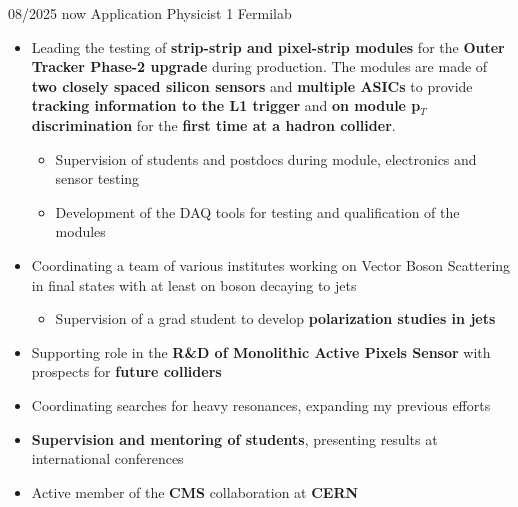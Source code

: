   \position
  {08/2025  \textemdash{} now} 
   {Application Physicist 1}
   {Fermilab}
{\begin{itemize}

\item Leading the testing of {\bf strip-strip and pixel-strip modules} for the {\bf Outer Tracker Phase-2 upgrade} during production. The modules are made of {\bf two closely spaced silicon sensors} and {\bf multiple ASICs} to provide {\bf tracking information to the L1 trigger} and {\bf on module p$_{T}$ discrimination} for the {\bf first time at a hadron collider}.
\begin{itemize}
\item Supervision of students and postdocs during module, electronics and sensor testing
\item Development of the DAQ tools for testing and qualification of the modules
\end{itemize}
\item Coordinating a team of various institutes working on Vector Boson Scattering in final states with at least on boson decaying to jets
\begin{itemize}
\item Supervision of a grad student to develop {\bf polarization studies in jets} %
\end{itemize}
\item Supporting role in the {\bf R\&D of Monolithic Active Pixels Sensor} with prospects for {\bf future colliders}
\item Coordinating searches for heavy resonances, expanding my previous efforts
\item {\bf Supervision and mentoring of students}, presenting results at international conferences
\item Active member of the {\bf CMS} collaboration at {\bf CERN}  
   
 \end{itemize}
}
  

